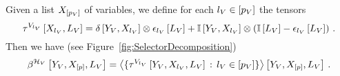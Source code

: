 \begin{theorem}\label{the:varSelectorDecomposition}
	Given a list $X_{[p_{V}]}$ of variables, we define for each $l_{V}\in[p_{V}]$ the tensors
		\[ \tau^{V_{l_{V}}}\left[X_{l_{V}},L_{V}\right] 
		= \delta\left[Y_{V},X_{l_{V}}\right] \otimes \epsilon_{l_{V}}\left[L_{V}\right] 
		+ \mathbb{I}\left[Y_{V},X_{l_{V}}\right] \otimes \left(\mathbb{I}\left[L_{V}\right] - \epsilon_{l_{V}}\left[L_{V}\right] \right) \, . 
		\]
	Then we have (see Figure~\ref{fig:SelectorDecomposition})
		\[ \beta^{\mathcal{H}_{V}}\left[Y_{V},X_{[p]},L_{V}\right]
		= \left\langle 
			\{\tau^{V_{l_{V}}}\left[Y_{V},X_{l_{V}},L_{V}\right] \, : \, l_{V}\in[p_{V}]\}
		\right\rangle \left[ Y_{V},X_{[p]},L_{V} \right] \, .
		\]
\end{theorem}
